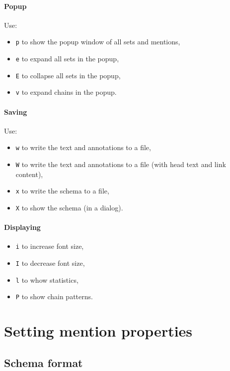 \documentclass[12pt]{article}
\begin{document}
\paragraph{Popup} Use:
\begin{itemize}
   \item \verb|p| to show the popup window of all sets and mentions,
   \item \verb|e| to expand all sets in the popup,
   \item \verb|E| to collapse all sets in the popup,
   \item \verb|v| to expand chains in the popup.
\end{itemize}

\paragraph{Saving} Use:
\begin{itemize}
   \item \verb|w| to write the text and annotations to a file,
   \item \verb|W| to write the text and annotations to a file (with head text
   and link content),
   \item \verb|x| to write the schema to a file,
   \item \verb|X| to show the schema (in a dialog).
\end{itemize}

\paragraph{Displaying}
\begin{itemize}
   \item \verb|i| to increase font size,
   \item \verb|I| to decrease font size,
   \item \verb|l| to whow statistics,
   \item \verb|P| to show chain patterns.
\end{itemize}


 \section{Setting mention properties}

 \subsection{Schema format}
\end{document}

